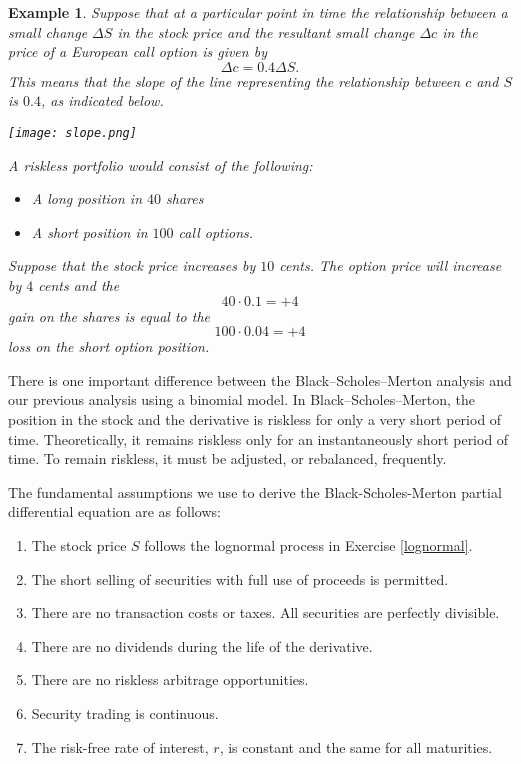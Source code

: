 \documentclass[letterpaper,10pt]{article}
\newtheorem{exa}{Example}[section]
\begin{document}
\begin{exa} Suppose that at a particular point in time the relationship between a small change $\Delta S$ in the stock price and the resultant small change $\Delta c$ in the price of a European call option is given by $$\Delta c=0.4\Delta S.$$
This means that the slope of the line representing the relationship between $c$ and $S$
is $0.4$, as indicated below. 

\begin{center}
\texttt{[image: slope.png]}
\end{center}

\noindent A riskless portfolio would consist of the following:
\begin{itemize}
\item A long position in $40$ shares
\item A short position in $100$ call options.
\end{itemize}

\noindent Suppose that the stock price increases by $10$ cents. The option price will increase by $4$ cents and the $$40 \cdot 0.1 = +4$$ gain on the shares is equal to the $$100 \cdot 0.04 = +4$$ loss on the short option position.

\end{exa}

There is one important difference between the Black–Scholes–Merton analysis and our previous analysis using a binomial model. In Black–Scholes–Merton, the position in the stock and the derivative is riskless for only a very short period of time. Theoretically, it remains riskless only for an instantaneously short period of time. To remain riskless, it must be adjusted, or rebalanced, frequently.

\noindent The fundamental assumptions we use to derive the Black-Scholes-Merton partial differential equation are as follows:

\begin{enumerate}

\item The stock price $S$ follows the lognormal process in Exercise \ref{lognormal}.

\item The short selling of securities with full use of proceeds is permitted.
\item There are no transaction costs or taxes. All securities are perfectly divisible.
\item There are no dividends during the life of the derivative.
\item There are no riskless arbitrage opportunities.
\item Security trading is continuous.
\item The risk-free rate of interest, $r$, is constant and the same for all maturities.

\end{enumerate}
\end{document}
